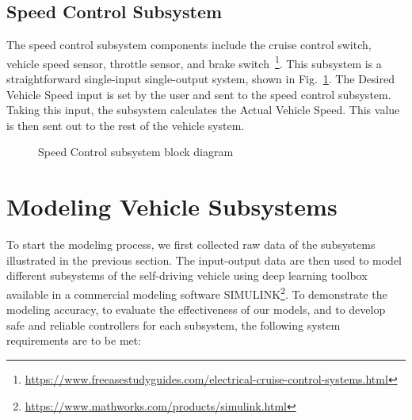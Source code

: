 \documentclass[conference]{IEEEtran}
\begin{document}
  \subsection{Speed Control Subsystem}
  The speed control subsystem components include the cruise control switch, vehicle speed sensor, throttle sensor, and brake switch~\footnote{\url{https://www.freeasestudyguides.com/electrical-cruise-control-systems.html}}. This subsystem is a straightforward single-input single-output system, shown in Fig.~\ref{fig:speedControlModelArchitecture}. The Desired Vehicle Speed input is set by the user and sent to the speed control subsystem. Taking this input, the subsystem calculates the Actual Vehicle Speed. This value is then sent out to the rest of the vehicle system.
 \begin{figure}[htbp]
    \centering
    \caption{Speed Control subsystem block diagram}
    \label{fig:speedControlModelArchitecture}
 \end{figure}

\section{Modeling Vehicle Subsystems}

To start the modeling process, we first collected raw data of the subsystems illustrated in the previous section. The input-output data are then used to model different subsystems of the self-driving vehicle using deep learning toolbox available in a commercial modeling software SIMULINK\footnote{\url{https://www.mathworks.com/products/simulink.html}}. To demonstrate the modeling accuracy, to evaluate the effectiveness of our models, and to develop safe and reliable controllers for each subsystem, the following system requirements are to be met:
\end{document}
